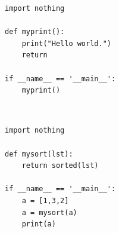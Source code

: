 \documentclass[]{article}
\begin{document}
\newpage


    \begin{lstlisting}
import nothing

def myprint():
    print("Hello world.")
    return
    
if __name__ == '__main__':
    myprint()
    \end{lstlisting}
    
~\\
    \begin{lstlisting}
import nothing

def mysort(lst):
    return sorted(lst)
    
if __name__ == '__main__':
    a = [1,3,2]
    a = mysort(a)
    print(a)
    \end{lstlisting}
\end{document}
